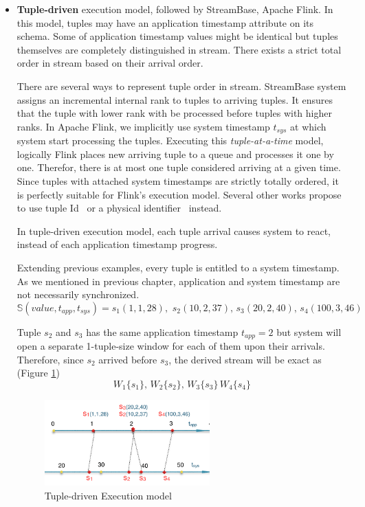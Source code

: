 \begin{itemize}
	\item \textbf{Tuple-driven} execution model, followed by StreamBase, Apache Flink. In this model, tuples may have an application timestamp attribute on its schema. Some of application timestamp values might be identical but tuples themselves are completely distinguished in stream. There exists a strict total order in stream based on their arrival order. 
	
	There are several ways to represent tuple order in stream. StreamBase system assigns an incremental internal rank to tuples to arriving tuples. It ensures that the tuple with lower rank with be processed before tuples with higher ranks. In Apache Flink, we implicitly use system timestamp   $t_{sys}$ at which system start processing the tuples. Executing this \textit{tuple-at-a-time} model, logically Flink places new arriving tuple to a queue and processes it one by one. Therefor, there is at most one tuple  considered arriving at a given time.  Since tuples with attached system timestamps are strictly totally ordered, it is perfectly suitable for Flink's execution model. Several other works propose to use tuple Id~\citep{Dindar:2013} or a physical identifier~\citep{Petit:2010} instead. 	
	
	In tuple-driven execution model, each tuple arrival causes system to react, instead of each application timestamp progress. 
	
	Extending previous examples, every tuple is entitled to a system timestamp. As we mentioned in previous chapter, application and system timestamp are not necessarily synchronized.
	\begin{equation}
			\mathbb{S}(value, t_{app}, t_{sys}) = s_1(1,1,28),\,\,s_2(10,2,37),\,s_3(20,2,40),\, s_4(100,3,46)
	\end{equation}
	
	Tuple $s_2$ and $s_3$ has the same application timestamp $t_{app} = 2$ but system will open a separate 1-tuple-size window for each of them upon their arrivals. Therefore, since $s_2$ arrived before $s_3$, the derived stream will be exact as (Figure \ref{fig:tuple-driven})
	\begin{equation}
W_1\{s_1\},\, W_2\{s_2\},\, W_3\{s_3\}\,W_4\{s_4\}
\end{equation}
	
	\begin{figure}[htbp!] 
\centering    
\includegraphics[width=0.6\textwidth]{tuple-driven}
\caption{Tuple-driven Execution model}
\label{fig:tuple-driven}
\end{figure}
	

\end{itemize}
